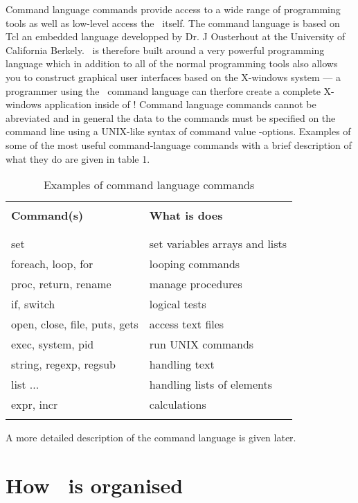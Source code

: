 Command language commands provide access to a wide range of programming
tools as well as low-level access the \Anmap\ itself.  The command
language is based on Tcl an embedded language developped by
Dr. J Ousterhout at the University of California Berkely.  \Anmap\
is therefore built around a very powerful programming language which
in addition to all of the normal programming tools also allows you to
construct graphical user interfaces based on the X-windows system --- a
programmer using the \Anmap\ command language can therfore create a
complete X-windows application inside of \Anmap!
Command language commands cannot be abreviated and in general the data
to the commands must be specified on the command line using a UNIX-like
syntax of command value -options.  Examples of some of the most useful
command-language commands with a brief description of what they do are
given in table 1.
\begin{table}
\begin{tabular}{|l||l|}
\hline
& \\
{\bf Command(s)} & {\bf What is does} \\
& \\ \hline
& \\
set & set variables arrays and lists \\
foreach, loop, for & looping commands \\
proc, return, rename & manage procedures \\
if, switch & logical tests \\
open, close, file, puts, gets & access text files \\
exec, system, pid & run UNIX commands \\
string, regexp, regsub & handling text \\
list ... & handling lists of elements \\
expr, incr & calculations \\
& \\ \hline
\end{tabular}
\caption{Examples of command language commands}
\end{table}
A more detailed description of the command language is given
later.

\section{How \Anmap\ is organised}

